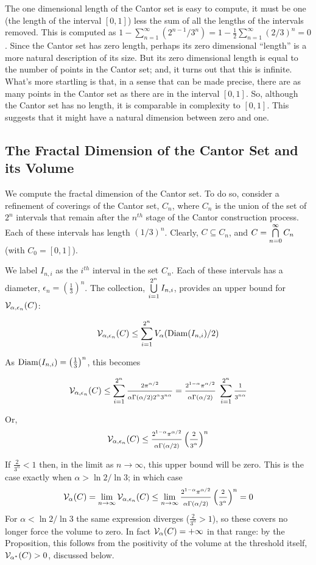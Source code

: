 The one dimensional length of the Cantor set is
easy to compute, it must be one (the length of the interval $[0,1]$) 
less the sum of all the lengths of the
intervals removed. This is computed as $1
- \sum_{n=1}^\infty (2^{n-1}/3^n) = 1 - \frac{1}{2}
\sum_{n=1}^\infty (2/3)^n = 0$. Since the Cantor set has zero length,
perhaps its zero dimensional ``length'' is a more natural description
of its size. But its zero dimensional length is equal to the 
number of points in the Cantor set; and, it turns out that this is infinite. 
What's more startling is
that, in a sense that can be made precise, there are as many points in
the Cantor set as there are in the interval $[0,1]$. So, although the 
Cantor set has no length, it is comparable in complexity
to $[0,1]$. This suggests that it might have a natural dimension
between zero and one.

\subsection{The Fractal Dimension of the Cantor Set and its Volume}
We compute the fractal dimension of the Cantor set. To do so, 
consider a refinement of coverings of the Cantor set, $C_n$, where
$C_n$ is the union of the set of $2^n$ intervals that remain after 
the $n^{th}$ stage of the Cantor construction process. Each of these 
intervals has length $(1/3)^n$. 
Clearly, $C \subseteq C_n$, and $C = \bigcap_{n=0}^\infty\limits C_n$
(with $C_0 = [0,1]$).

We label $I_{n,i}$ as the $i^{th}$ interval in the set
$C_n$. Each of these intervals has a diameter, $\epsilon_n = \left(\frac{1}{3}\right)^n$.
The collection, $\bigcup_{i=1}^{2^n}\limits I_{n,i}$, provides an
upper bound for ${\cal V}_{\alpha, \epsilon_n}(C)$:


$$
{\cal V}_{\alpha, \epsilon_n}(C) \le \sum_{i=1}^{2^n} V_\alpha({\rm
  Diam}(I_{n,i}) / 2)
$$

As ${\rm Diam}(I_{n,i}) = \left(\frac{1}{3}\right)^n$, this becomes


$$
{\cal V}_{\alpha, \epsilon_n}(C) \le \sum_{i=1}^{2^n} \frac{2
  \pi^{\alpha/2}}{ \alpha \Gamma(\alpha/2) 2^\alpha 3^{n\alpha}}
  =  \frac{
  2^{1 - \alpha} \pi^{\alpha/2}}{\alpha \Gamma(\alpha/2)} \;
  \sum_{i=1}^{2^n}
\frac{1}{3^{n\alpha}}
$$

Or, 
$$
{\cal V}_{\alpha, \epsilon_n}(C) \le \frac{ 2^{1-\alpha} \pi^{\alpha/2}}{\alpha
  \Gamma(\alpha/2)} \left(\frac{2}{3^\alpha}\right)^n
$$


If $\frac{2}{3^\alpha} < 1$ then, in the limit as
$n \rightarrow \infty$,
this upper bound will be zero. This is the case
exactly when $\alpha > \ln 2 / \ln 3$; in which case
$$
{\cal V}_\alpha(C) =  \lim_{n \rightarrow \infty} {\cal V}_{\alpha, \epsilon_n}(C) \le \lim_{n \rightarrow \infty}  \frac{ 2^{1-\alpha}
\pi^{\alpha/2}}{\alpha
  \Gamma(\alpha/2)} \left(\frac{2}{3^\alpha}\right)^n = 0
$$
For $\alpha < \ln 2 / \ln 3$ the same expression diverges
($\frac{2}{3^\alpha} > 1$), so these covers no longer force the volume to
zero. In fact ${\cal V}_\alpha(C) = +\infty$ in that range: by the
Proposition, this follows from the positivity of the volume at the
threshold itself, ${\cal V}_{\alpha^*}(C) > 0$, discussed below.

